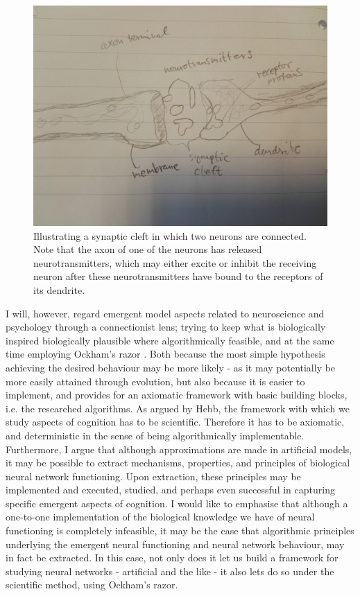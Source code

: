 \begin{figure}
    \centering
    \includegraphics[width=12cm]{fig/synaptic-cleft.jpg}
    \caption{Illustrating a synaptic cleft in which two neurons are connected. Note that the axon of one of the neurons has released neurotransmitters, which may either excite or inhibit the receiving neuron after these neurotransmitters have bound to the receptors of its dendrite.}
    \label{fig:synaptic-cleft}
\end{figure}

I will, however, regard emergent model aspects related to neuroscience and psychology through a connectionist lens; trying to keep what is biologically inspired biologically plausible where algorithmically feasible, and at the same time employing Ockham's razor \citep{Russell2009chpt18}. Both because the most simple hypothesis achieving the desired behaviour may be more likely - as it may potentially be more easily attained through evolution, but also because it is easier to implement, and provides for an axiomatic framework with basic building blocks, i.e. the researched algorithms. As argued by Hebb, the framework with which we study aspects of cognition has to be scientific. Therefore it has to be axiomatic, and deterministic in the sense of being algorithmically implementable. Furthermore, I argue that although approximations are made in artificial models, it may be possible to extract mechanisms, properties, and principles of biological neural network functioning. Upon extraction, these principles may be implemented and executed, studied, and perhaps even successful in capturing specific emergent aspects of cognition. I would like to emphasise that although a one-to-one implementation of the biological knowledge we have of neural functioning is completely infeasible, it may be the case that algorithmic principles underlying the emergent neural functioning and neural network behaviour, may in fact be extracted. In this case, not only does it let us build a framework for studying neural networks - artificial and the like - it also lets do so under the scientific method, using Ockham's razor.

